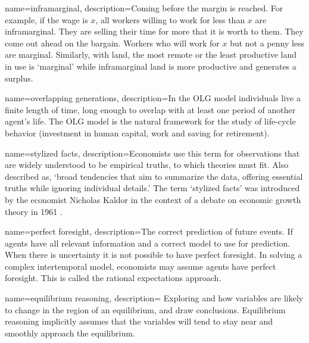{
name=inframarginal,
description={Coming before the margin is reached. For example, if the wage is $x$, all workers willing to work for less than $x$ are inframarginal. They are selling their time for more that it is worth to them. They come out ahead on the bargain. Workers who will work for $x$ but not a penny less are marginal. Similarly, with land, the most remote or the least productive land in use is `marginal' while  inframarginal land is more productive and generates a \gls{surplus}.}
}

{
name=overlapping generations,
description={In the \gls{OLG} model individuals live a finite length of time, long enough to overlap with at least one period of another agent's life. The OLG model is the natural framework for the study of life-cycle behavior (investment in human capital, work and saving for retirement).}
}

{
name=stylized facts,
description={Economists use this term for observations that are widely understood to be empirical truths, to which theories must fit.  Also described as, `broad tendencies that aim to summarize the data, offering essential truths while ignoring individual details.' The term `stylized facts' was introduced by the economist Nicholas Kaldor in the context of a debate on economic growth theory in 1961 \cite{kaldorCapitalAccumulationEconomic1961}.}
}

{
name=perfect foresight,
description={The correct prediction of future events. If agents have  all relevant information and  a correct model to use for prediction. When there is uncertainty it is not possible to have perfect foresight. In solving a complex intertemporal model, economists may assume agents have perfect foresight. This is called the rational expectations approach.}
}

{
name=equilibrium reasoning,
description={%
Exploring and how variables are likely to change in the region of an \gls{equilibrium}, and draw conclusions. %
Equilibrium reasoning implicitly assumes that the variables will tend to stay near and smoothly approach the equilibrium.}
}

